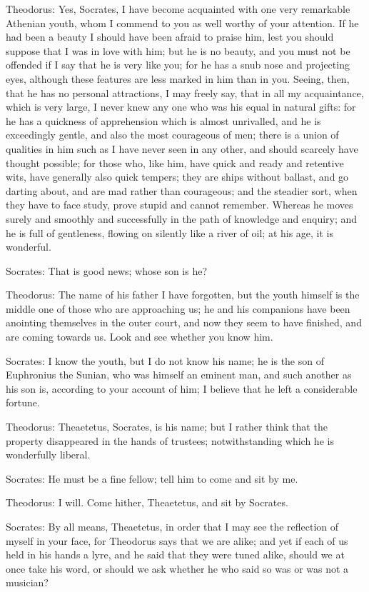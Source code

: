 Theodorus: Yes, Socrates, I have become acquainted with one very
remarkable Athenian youth, whom I commend to you as well worthy of your
attention. If he had been a beauty I should have been afraid to praise
him, lest you should suppose that I was in love with him; but he is no
beauty, and you must not be offended if I say that he is very like you;
for he has a snub nose and projecting eyes, although these features are
less marked in him than in you. Seeing, then, that he has no personal
attractions, I may freely say, that in all my acquaintance, which is
very large, I never knew any one who was his equal in natural gifts: for
he has a quickness of apprehension which is almost unrivalled, and he
is exceedingly gentle, and also the most courageous of men; there is a
union of qualities in him such as I have never seen in any other, and
should scarcely have thought possible; for those who, like him, have
quick and ready and retentive wits, have generally also quick tempers;
they are ships without ballast, and go darting about, and are mad rather
than courageous; and the steadier sort, when they have to face study,
prove stupid and cannot remember. Whereas he moves surely and smoothly
and successfully in the path of knowledge and enquiry; and he is full of
gentleness, flowing on silently like a river of oil; at his age, it is
wonderful.

Socrates: That is good news; whose son is he?

Theodorus: The name of his father I have forgotten, but the youth
himself is the middle one of those who are approaching us; he and his
companions have been anointing themselves in the outer court, and now
they seem to have finished, and are coming towards us. Look and see
whether you know him.

Socrates: I know the youth, but I do not know his name; he is the son of
Euphronius the Sunian, who was himself an eminent man, and such another
as his son is, according to your account of him; I believe that he left
a considerable fortune.

Theodorus: Theaetetus, Socrates, is his name; but I rather think that
the property disappeared in the hands of trustees; notwithstanding which
he is wonderfully liberal.

Socrates: He must be a fine fellow; tell him to come and sit by me.

Theodorus: I will. Come hither, Theaetetus, and sit by Socrates.

Socrates: By all means, Theaetetus, in order that I may see the
reflection of myself in your face, for Theodorus says that we are alike;
and yet if each of us held in his hands a lyre, and he said that they
were tuned alike, should we at once take his word, or should we ask
whether he who said so was or was not a musician?


